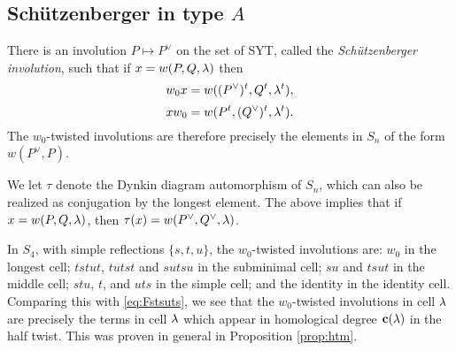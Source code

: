 



\subsection{Sch\"utzenberger in type $A$}
\label{subsec:more}

\begin{prop} \label{prop:Schutz}  There is an involution $P\mapsto P^\vee$ on the set of SYT, called the \emph{Sch\"utzenberger involution}, such that if $x = w(P,Q,\lambda)$ then
\begin{equation}
w_0 x = w((P^\vee)^t,Q^t,\lambda^t),
\end{equation}
\begin{equation}
x w_0 = w(P^t,(Q^\vee)^t,\lambda^t).
\end{equation}
The $w_0$-twisted involutions are therefore precisely the elements in $S_n$ of the form $w(P^\vee,P)$. \end{prop}

We let $\tau$ denote the Dynkin diagram automorphism of $S_n$, which can also be realized as conjugation by the longest element. The above implies that if $x = w(P,Q,\lambda)$, then $\tau(x) = w(P^\vee,Q^\vee,\lambda)$.

\begin{ex} In $S_4$, with simple reflections $\{s,t,u\}$, the $w_0$-twisted involutions are: $w_0$ in the longest cell; $tstut$, $tutst$ and $sutsu$ in the subminimal cell; $su$ and
$tsut$ in the middle cell; $stu$, $t$, and $uts$ in the simple cell; and the identity in the identity cell. Comparing this with \eqref{eq:Fstsuts}, we see that the $w_0$-twisted
involutions in cell $\lambda$ are precisely the terms in cell $\lambda$ which appear in homological degree $\mathbf{c}(\lambda)$ in the half twist. This was proven in general in Proposition \ref{prop:htm}.
\end{ex}

